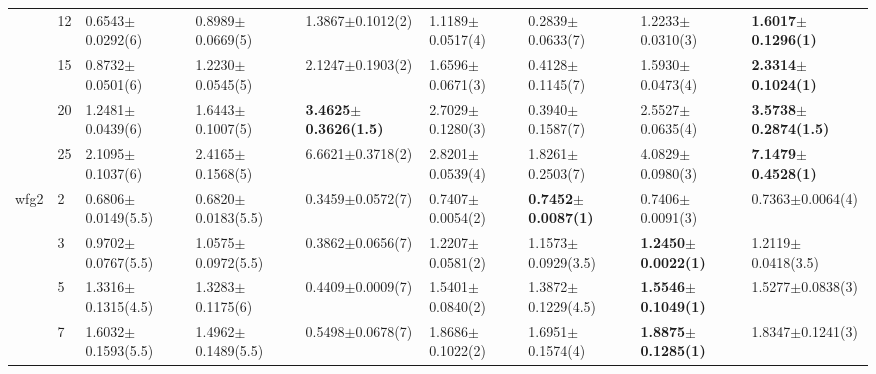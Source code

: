 \begin{table*}[]
\begin{adjustbox}{width=1.0\textwidth,center}
\begin{tabular}{lllllllll}
      & 12                             & 0.6543$\pm$0.0292(6)         & 0.8989$\pm$0.0669(5)          & 1.3867$\pm$0.1012(2)              & 1.1189$\pm$0.0517(4)                              & 0.2839$\pm$0.0633(7)                     & 1.2233$\pm$0.0310(3)                       & \textbf{1.6017$\pm$0.1296(1)}   \\
      & 15                             & 0.8732$\pm$0.0501(6)         & 1.2230$\pm$0.0545(5)          & 2.1247$\pm$0.1903(2)              & 1.6596$\pm$0.0671(3)                              & 0.4128$\pm$0.1145(7)                     & 1.5930$\pm$0.0473(4)                       & \textbf{2.3314$\pm$0.1024(1)}   \\
      & 20                             & 1.2481$\pm$0.0439(6)         & 1.6443$\pm$0.1007(5)          & \textbf{3.4625$\pm$0.3626(1.5)}   & 2.7029$\pm$0.1280(3)                              & 0.3940$\pm$0.1587(7)                     & 2.5527$\pm$0.0635(4)                       & \textbf{3.5738$\pm$0.2874(1.5)} \\
      & 25                             & 2.1095$\pm$0.1037(6)         & 2.4165$\pm$0.1568(5)          & 6.6621$\pm$0.3718(2)              & 2.8201$\pm$0.0539(4)                              & 1.8261$\pm$0.2503(7)                     & 4.0829$\pm$0.0980(3)                       & \textbf{7.1479$\pm$0.4528(1)}  \\\thickhline
wfg2  & 2                              & 0.6806$\pm$0.0149(5.5)       & 0.6820$\pm$0.0183(5.5)        & 0.3459$\pm$0.0572(7)              & 0.7407$\pm$0.0054(2)                              & \textbf{0.7452$\pm$0.0087(1)}            & 0.7406$\pm$0.0091(3)                       & 0.7363$\pm$0.0064(4)            \\
      & 3                              & 0.9702$\pm$0.0767(5.5)       & 1.0575$\pm$0.0972(5.5)        & 0.3862$\pm$0.0656(7)              & 1.2207$\pm$0.0581(2)                              & 1.1573$\pm$0.0929(3.5)                   & \textbf{1.2450$\pm$0.0022(1)}              & 1.2119$\pm$0.0418(3.5)          \\
      & 5                              & 1.3316$\pm$0.1315(4.5)       & 1.3283$\pm$0.1175(6)          & 0.4409$\pm$0.0009(7)              & 1.5401$\pm$0.0840(2)                              & 1.3872$\pm$0.1229(4.5)                   & \textbf{1.5546$\pm$0.1049(1)}              & 1.5277$\pm$0.0838(3)            \\
      & 7                              & 1.6032$\pm$0.1593(5.5)       & 1.4962$\pm$0.1489(5.5)        & 0.5498$\pm$0.0678(7)              & 1.8686$\pm$0.1022(2)                              & 1.6951$\pm$0.1574(4)                     & \textbf{1.8875$\pm$0.1285(1)}              & 1.8347$\pm$0.1241(3)            \\

\end{tabular}
\end{adjustbox}
\end{table*}
